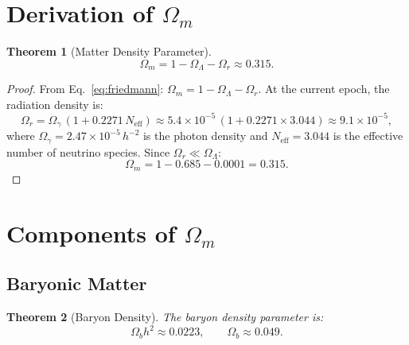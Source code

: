 \documentclass[12pt,a4paper]{article}
\newtheorem{theorem}{Theorem}[section]
\theoremstyle{definition}
\theoremstyle{remark}
\begin{document}
\section{Derivation of $\Omega_m$}
\label{sec:derivation}

\begin{theorem}[Matter Density Parameter]
\label{thm:omega-m}
\begin{equation}
  \boxed{\Omega_m = 1 - \Omega_\Lambda - \Omega_r
  \approx 0.315.}
\end{equation}
\end{theorem}

\begin{proof}
From Eq.~\eqref{eq:friedmann}:
$\Omega_m = 1 - \Omega_\Lambda - \Omega_r$.  At the current epoch,
the radiation density is:
\begin{equation}
  \Omega_r = \Omega_\gamma\,(1 + 0.2271\,N_{\mathrm{eff}})
  \approx 5.4 \times 10^{-5}\,(1 + 0.2271 \times 3.044)
  \approx 9.1 \times 10^{-5},
\end{equation}
where $\Omega_\gamma = 2.47 \times 10^{-5}\,h^{-2}$ is the photon
density and $N_{\mathrm{eff}} = 3.044$ is the effective number of
neutrino species.  Since $\Omega_r \ll \Omega_\Lambda$:
\begin{equation}
  \Omega_m = 1 - 0.685 - 0.0001 = 0.315.
\end{equation}
\end{proof}

\section{Components of $\Omega_m$}
\label{sec:components}

\subsection{Baryonic Matter}

\begin{theorem}[Baryon Density]
\label{thm:baryon}
The baryon density parameter is:
\begin{equation}
  \Omega_b h^2 \approx 0.0223, \qquad
  \Omega_b \approx 0.049.
\end{equation}
\end{theorem}
\end{document}
